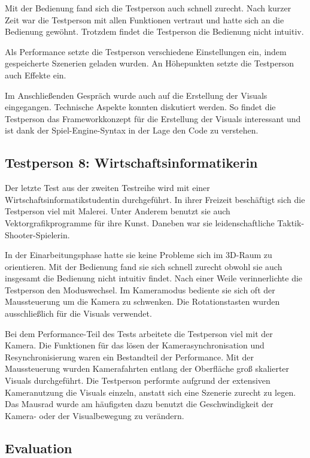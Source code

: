 Mit der Bedienung fand sich die Testperson auch schnell zurecht. Nach kurzer Zeit war die Testperson mit allen Funktionen vertraut und hatte sich an die
Bedienung gew\"ohnt. Trotzdem findet die Testperson die Bedienung nicht intuitiv.

Als Performance setzte die Testperson verschiedene Einstellungen ein, indem gespeicherte Szenerien geladen wurden. An H\"ohepunkten setzte die Testperson
auch Effekte ein.

Im Anschlie\ss{}enden Gespr\"ach wurde auch auf die Erstellung der Visuals eingegangen. Technische Aspekte konnten diskutiert werden. So findet die Testperson
das Frameworkkonzept f\"ur die Erstellung der Visuals interessant und ist dank der Spiel-Engine-Syntax in der Lage den Code zu verstehen.

\subsection{Testperson 8: Wirtschaftsinformatikerin}

Der letzte Test aus der zweiten Testreihe wird mit einer Wirtschaftsinformatikstudentin durchgef\"uhrt. In ihrer Freizeit besch\"aftigt sich die Testperson
viel mit Malerei. Unter Anderem benutzt sie auch Vektorgrafikprogramme f\"ur ihre Kunst. Daneben war sie leidenschaftliche Taktik-Shooter-Spielerin.

In der Einarbeitungsphase hatte sie keine Probleme sich im 3D-Raum zu orientieren. Mit der Bedienung fand sie sich schnell zurecht obwohl sie auch insgesamt
die Bedienung nicht intuitiv findet. Nach einer Weile verinnerlichte die Testperson den Moduswechsel. Im Kameramodus bediente sie sich oft der Maussteuerung
um die Kamera zu schwenken. Die Rotationstasten wurden ausschlie\ss{}lich f\"ur die Visuals verwendet.

Bei dem Performance-Teil des Tests arbeitete die Testperson viel mit der Kamera. Die Funktionen f\"ur das l\"osen der Kamerasynchronisation und Resynchronisierung
waren ein Bestandteil der Performance. Mit der Maussteuerung wurden Kamerafahrten entlang der Oberfl\"ache gro\ss{} skalierter Visuals durchgef\"uhrt.
Die Testperson performte aufgrund der extensiven Kameranutzung die Visuals einzeln, anstatt sich eine Szenerie zurecht zu legen. Das Mausrad wurde am
h\"aufigsten dazu benutzt die Geschwindigkeit der Kamera- oder der Visualbewegung zu ver\"andern.

\subsection{Evaluation}

